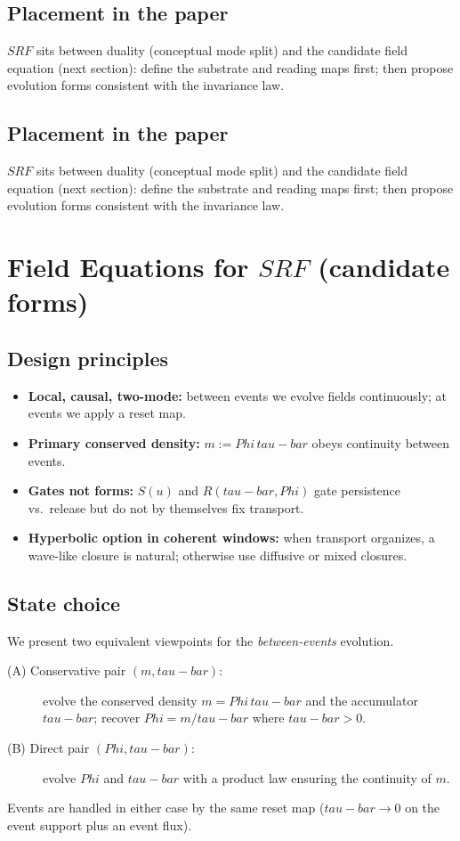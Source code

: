 \documentclass[12pt]{article}
\newcommand{\FoldDensity}{\Phi}
\newcommand{\FoldTime}{\bar{\tau}}
\newcommand{\Survival}{S}
\newcommand{\Release}{R}
\newcommand{\SRF}{\mathcal{F}_{\mathrm{SR}}}
\def\FoldDensity{Phi}%
\def\FoldTime{tau-bar}%
\def\SRF{SRF}%
\def\Survival{S}%
\def\Release{R}%
\def\bar#1{#1}%
\def\mathcal#1{#1}%
\def\mathrm#1{#1}%
\begin{document}
\subsection{Placement in the paper}
$\SRF$ sits between duality (conceptual mode split) and the candidate field equation (next section):
define the substrate and reading maps first; then propose evolution forms consistent with the invariance law.
\subsection{Placement in the paper}
$\SRF$ sits between duality (conceptual mode split) and the candidate field equation (next section):
define the substrate and reading maps first; then propose evolution forms consistent with the invariance law.



\section[Field Equations for SRF (candidate forms)]{Field Equations for $\SRF$ (candidate forms)}

\subsection{Design principles}
\begin{itemize}
  \item \textbf{Local, causal, two-mode:} between events we evolve fields continuously; at events we apply a reset map.
  \item \textbf{Primary conserved density:} $m := \FoldDensity\,\FoldTime$ obeys continuity between events.
  \item \textbf{Gates not forms:} $\Survival(u)$ and $\Release(\FoldTime,\FoldDensity)$ gate persistence vs.\ release but do not by themselves fix transport.
  \item \textbf{Hyperbolic option in coherent windows:} when transport organizes, a wave-like closure is natural; otherwise use diffusive or mixed closures.
\end{itemize}

\subsection{State choice}
We present two equivalent viewpoints for the \emph{between-events} evolution.
\begin{description}
  \item[(A) Conservative pair $(m,\FoldTime)$:] evolve the conserved density $m=\FoldDensity\,\FoldTime$ and the accumulator $\FoldTime$; recover $\FoldDensity = m/\FoldTime$ where $\FoldTime>0$.
  \item[(B) Direct pair $(\FoldDensity,\FoldTime)$:] evolve $\FoldDensity$ and $\FoldTime$ with a product law ensuring the continuity of $m$.
\end{description}
Events are handled in either case by the same reset map ($\FoldTime\!\to\!0$ on the event support plus an event flux).
\end{document}
